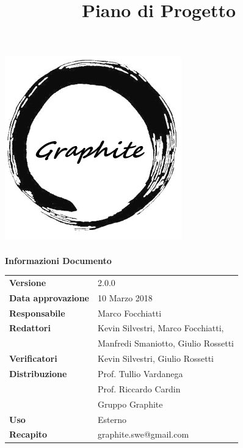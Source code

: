 \documentclass[openany,12pt,a4paper]{report}
\title{Piano di Progetto}
\author{}
\newcommand{\versione}{2.0.0}
\begin{document}
	\makeatletter
	\begin{titlepage}
		\setlength{\headsep}{0pt}  
		\begin{center}
			\includegraphics[width=0.5\linewidth]{Logo.png}\\[1em]
			{\huge \bfseries  \@title }\\[10ex]
			\textbf{\Large Informazioni Documento} \\[2em]
			\bgroup
			\def\arraystretch{1.5}
			\begin{tabular}{l|l}
				\textbf{Versione} & \versione{}  \\
				\textbf{Data approvazione} & 10 Marzo 2018 \\
				\textbf{Responsabile} & Marco Focchiatti \\
				\textbf{Redattori} & Kevin Silvestri, Marco Focchiatti, \\ 
								   & Manfredi Smaniotto, Giulio Rossetti \\
				\textbf{Verificatori} & Kevin Silvestri, Giulio Rossetti \\
				\textbf{Distribuzione} & Prof. Tullio Vardanega \\
				 & Prof. Riccardo Cardin \\
				 & Gruppo Graphite \\
				\textbf{Uso} & Esterno \\
				\textbf{Recapito} & graphite.swe@gmail.com \\
			\end{tabular}
		\egroup
		\end{center}
	\end{titlepage}
	\makeatother

	\thispagestyle{empty}
	\newpage
	
	
	
	\tableofcontents
	\listoffigures
	\listoftables
	
	
	
	
	
	
	
\end{document}
